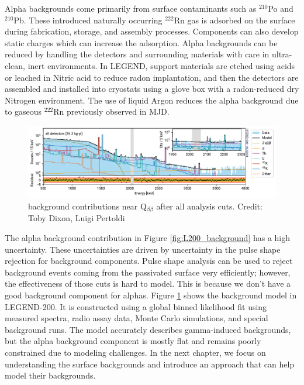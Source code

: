 Alpha backgrounds come primarily from surface contaminants such as $^{210}$Po and $^{210}$Pb. These introduced naturally occurring $^{222}$Rn gas is adsorbed on the surface during fabrication, storage, and assembly processes. Components can also develop static charges which can increase the adsorption. Alpha backgrounds can be reduced by handling the detectors and surrounding materials with care in ultra-clean, inert environments. In LEGEND, support materials are etched using acids or leached in Nitric acid to reduce radon implantation, and then the detectors are assembled and installed into cryostats using a glove box with a radon-reduced dry Nitrogen environment. The use of liquid Argon reduces the alpha background due to gaseous $^{222}$Rn previously observed in MJD.



\begin{figure}
\centering
  \includegraphics[width=0.99\linewidth]{ch2/figs/l200-bkgmodel-2_compressed.pdf}
  \caption{{\Ltwo} background contributions near Q$_{\beta\beta}$ after all analysis cuts. Credit: Toby Dixon, Luigi Pertoldi}
\label{ch2:fig:L200_background_model_fit}
  \end{figure}

  

 The alpha background contribution in Figure \ref{fig:L200_background} has a  high uncertainty. These uncertainties are driven by uncertainty in the pulse shape rejection for background components. Pulse shape analysis can be used to reject background events coming from the passivated surface very efficiently; however, the effectiveness of those cuts is hard to model. This is because we don't have a good background component for alphas. Figure \ref{ch2:fig:L200_background_model_fit} shows the background model in LEGEND-200. It is constructed using a global binned likelihood fit using measured spectra, radio assay data, Monte Carlo simulations, and special background runs. The model accurately describes gamma-induced backgrounds, but the alpha background component is mostly flat and remains poorly constrained due to modeling challenges. In the next chapter, we focus on understanding the surface backgrounds and introduce an approach that can help model their backgrounds.

